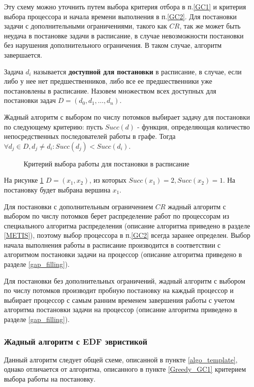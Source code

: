 Эту схему можно уточнить путем выбора критерия отбора в п.\ref{GC1} и критерия выбора процессора и начала времени выполнения в п.\ref{GC2}. Для постановки задачи с дополнительными ограничениями, такого как $CR$, так же может быть неудача в постановке задачи в расписание, в случае невозможности постановки без нарушения дополнительного ограничения. В таком случае, алгоритм завершается.

Задача $d_i$ называется \textbf{доступной для постановки} в расписание, в случае, если либо у нее нет предшественников, либо все ее предшественники уже постановлены в расписание. Назовем множеством всех доступных для постановки задач $D = \left( d_0, d_1, \ldots, d_n \right)$.

Жадный алгоритм с выбором по числу потомков выбирает задачу для постановки по следующему критерию: пусть $Succ(d)$ - функция, определяющая количество непосредственных последователей работы в графе. Тогда $\forall d_j \in D, d_j \neq d_i: Succ(d_j) < Succ(d_i)$.

\begin{figure}[!htbp]
    \caption{Критерий выбора работы для постановки в расписание}
    \label{fig:max-children}
\end{figure}
На рисунке \ref{fig:max-children} $D = \left( x_1, x_2 \right)$, из которых $Succ(x_1) = 2, Succ(x_2) = 1$. На постановку будет выбрана вершина $x_1$.

Для постановки с дополнительным ограничением $CR$ жадный алгоритм с выбором по числу потомков берет распределение работ по процессорам из специального алгоритма распределения (описание алгоритма приведено в разделе \ref{METIS}), поэтому выбор процессора в п.\ref{GC2} всегда заранее определен. Выбор начала выполнения работы в расписание производится в соответствии с алгоритмом постановки задачи на процессор (описание алгоритма приведено в разделе \ref{gap_filling}).

Для постановки без дополнительных ограничений, жадный алгоритм с выбором по числу потомков производит пробную постановку на каждый процессор и выбирает процессор с самым ранним временем завершения работы с учетом алгоритма постановки задачи на процессор (описание алгоритма приведено в разделе \ref{gap_filling}).

\subsubsection{Жадный алгоритм с EDF эвристикой} \label{Greedy_EDF}
Данный алгоритм следует общей схеме, описанной в пункте \ref{algo_template}, однако отличается от алгоритма, описанного в пункте \ref{Greedy_GC1} критерием выбора работы на постановку.

